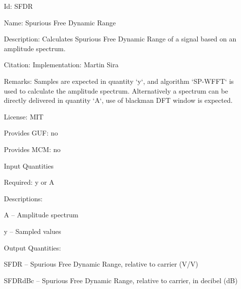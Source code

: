 \begin{tightdesc}
\item [Id:] SFDR
\item [Name:] Spurious Free Dynamic Range
\item [Description:] Calculates Spurious Free Dynamic Range of a signal based on an amplitude spectrum.
\item [Citation:] Implementation: Martin Sira
\item [Remarks:] Samples are expected in quantity `y`, and algorithm `SP-WFFT` is used to calculate the amplitude spectrum. Alternatively a spectrum can be directly delivered in quantity `A`, use of blackman DFT window is expected.
\item [License:] MIT
\item [Provides GUF:] no
\item [Provides MCM:] no
\item [Input Quantities] \rule{0em}{0em}
    \begin{tightdesc}
    \item [Required:] 
        \textsf{y} or \textsf{A}
    \item [Descriptions:] \rule{0em}{0em}
        \begin{tightdesc}
            \item[\textsf{A}] -- Amplitude spectrum
            \item[\textsf{y}] -- Sampled values
        \end{tightdesc}
    \end{tightdesc}
\item [Output Quantities:] \rule{0em}{0em}
    \begin{tightdesc}
        \item[\textsf{SFDR}] -- Spurious Free Dynamic Range, relative to carrier (V/V)
        \item[\textsf{SFDRdBc}] -- Spurious Free Dynamic Range, relative to carrier, in decibel (dB)
    \end{tightdesc}
\end{tightdesc}
